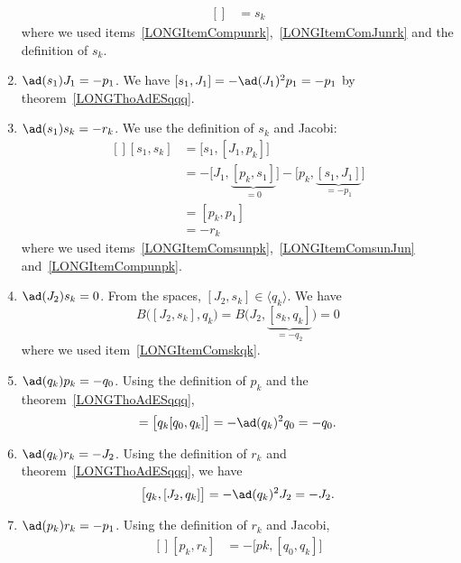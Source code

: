 \begin{enumerate}
\begin{equation}
\begin{aligned}[]
			          & =s_k
		\end{aligned}
	\end{equation}
	where we used items~\ref{LONGItemCompunrk},~\ref{LONGItemComJunrk} and the definition of $s_k$.
	\item$\ad(s_1)J_1=-p_1$\label{LONGItemComsunJun}. We have $[s_1,J_1]=-\ad(J_1)^2p_1=-p_1$ by theorem~\ref{LONGThoAdESqqq}.
	\item$\ad(s_1)s_k=-r_k$\label{LONGItemComsunsk}. We use the definition of $s_k$ and Jacobi:
	\begin{equation}
		\begin{aligned}[]
			[s_1,s_k] & =\big[ s_1,[J_1,p_k] \big]                                                                   \\
			          & =-\big[ J_1,\underbrace{[p_k,s_1]}_{=0} \big]-\big[ p_k,\underbrace{[s_1,J_1]}_{=-p_1} \big] \\
			          & =[p_k,p_1]                                                                                   \\
			          & =-r_k
		\end{aligned}
	\end{equation}
	where we used items~\ref{LONGItemComsunpk},~\ref{LONGItemComsunJun} and~\ref{LONGItemCompunpk}.
	\item$\ad(J_2)s_k=0$. From the spaces, $[J_2,s_k]\in\langle q_k\rangle$. We have
	\begin{equation}
		B\big( [J_2,s_k],q_k \big)=B\big( J_2,\underbrace{[s_k,q_k]}_{=-q_2} \big)=0
	\end{equation}
	where we used item~\ref{LONGItemComskqk}.
	\item$\ad(q_k)p_k=-q_0$. Using the definition of $p_k$ and the theorem~\ref{LONGThoAdESqqq},
	\begin{equation}
		[q_k,p_k]=\big[ q_k[q_0,q_k] \big]=-\ad(q_k)^2q_0=-q_0.
	\end{equation}
	\item$\ad(q_k)r_k=-J_2$\label{LONGItemComqkrk}. Using the definition of $r_k$ and theorem~\ref{LONGThoAdESqqq}, we have
	\begin{equation}
		\big[ q_k,[J_2,q_k] \big]=-\ad(q_k)^2J_2=-J_2.
	\end{equation}
	\item$\ad(p_k)r_k=-p_1$. Using the definition of $r_k$ and Jacobi,
	\begin{equation}
		\begin{aligned}[]
			[p_k,r_k] & =-\big[ pk,[q_0,q_k] \big]                                                                  \\

\end{aligned}
\end{equation}
\end{enumerate}
